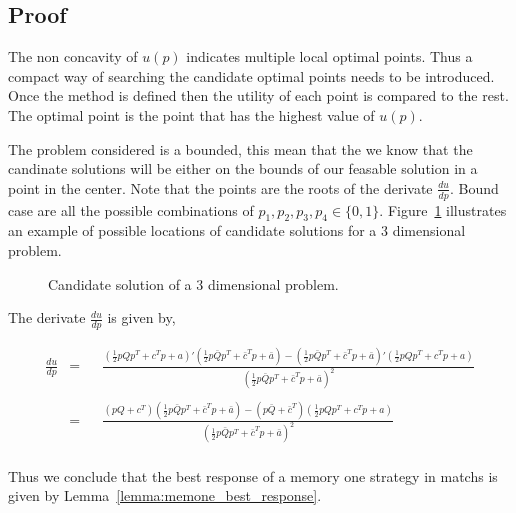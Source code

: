 \documentclass[10pt]{article}
\begin{document}
\subsection{Proof}

The non concavity of \(u(p)\) indicates multiple local optimal points. Thus a
compact way of searching the candidate optimal points needs to be introduced.
Once the method is defined then the utility of each point is compared to the
rest. The optimal point is the point that has the highest value of \(u(p)\).

The problem considered is a bounded, this mean that the we know that the candinate solutions
will be either on the bounds of our feasable solution in a point in the center.
Note that the points are the roots of the derivate \(\frac{du}{dp}\). Bound case are all
the possible combinations of \(p_1, p_2, p_3, p_4 \in \{0, 1\}\). Figure~\ref{fig:cube}
illustrates an example of possible locations of candidate solutions for a 3 dimensional
problem.

\begin{figure}
\begin{center}
    
    \caption{Candidate solution of a 3 dimensional problem.}\label{fig:cube}
\end{center}
\end{figure}

The derivate \(\frac{du}{dp}\) is given by,

\begin{equation}\label{eq:derivative_of_quadratic}
    \begin{aligned}
     \frac{du}{dp} & = && \frac{(  \frac{1}{2}p  Q  p^T + c^T p + a)'
      (  \frac{1}{2} p  \bar{Q}  p^T + \bar{c}^T  p + \bar{a}) - 
      (  \frac{1}{2} p  \bar{Q}  p^T + \bar{c}^T  p + \bar{a})'
      (  \frac{1}{2} p  Q  p^T + c^T p + a)}
      {(  \frac{1}{2} p  \bar{Q}  p^T + \bar{c}^T  p + \bar{a})^2} \\
      \\
    & = && \frac{(pQ + c^T) ( \frac{1}{2} p  \bar{Q}  p^T + \bar{c}^T  p + \bar{a}) 
    - (p\bar{Q} + \bar{c}^T)( \frac{1}{2} p  Q  p^T + c^T p + a)}
      {( \frac{1}{2} p  \bar{Q}  p^T + \bar{c}^T  p + \bar{a})^2} \\
    \end{aligned}
\end{equation}

Thus we conclude that the best response of a memory one strategy in matchs is
given by Lemma~\ref{lemma:memone_best_response}.
\end{document}
